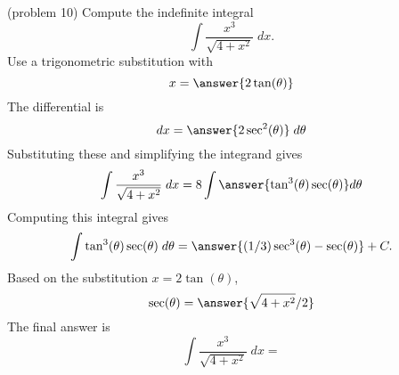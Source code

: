 \documentclass{ximera}
\begin{document}
\begin{problem}(problem 10)
Compute the indefinite integral
\[
\int \frac{x^3}{\sqrt{4 + x^2}} \; dx.
\]
Use a trigonometric substitution with\\
\[
x = \answer{2\tan(\theta)}
\]
The differential is\\
\[
dx = \answer{2\sec^2(\theta)} \; d\theta
\]
Substituting these and simplifying the integrand gives\\
\[
\int \frac{x^3}{\sqrt{4 + x^2}} \; dx = 8\int \answer{\tan^3(\theta)\sec(\theta)} d\theta
\]
Computing this integral gives
\[
\int \tan^3(\theta)\sec(\theta) \; d\theta = \answer{(1/3)\sec^3(\theta) - \sec(\theta)} + C.
\]
Based on the substitution $x = 2\tan(\theta)$, \\
\[
\sec(\theta) = \answer{\sqrt{4+x^2}/2}
\]
The final answer is
\[
\int  \frac{x^3}{\sqrt{4 + x^2}} \; dx = 
\]
\begin{center}
\begin{multipleChoice}
\end{multipleChoice}
\end{center}
\end{problem}
\end{document}
